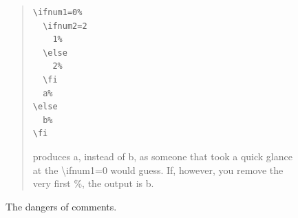 \documentclass{article} \usepackage[utf8]{inputenc}
\begin{document}
\begin{figure}[hbtp]
\begin{myquote}
\begin{quote}
\begin{lstlisting}[columns=fullflexible, backgroundcolor = \color{codebggray}]
\ifnum1=0%
  \ifnum2=2
    1%
  \else
    2%
  \fi
  a%
\else
  b%
\fi
\end{lstlisting}
produces a, instead of b, as someone that took a quick glance at the \textbackslash ifnum1=0 would guess. If, however, you remove the very first \%, the output is b.
\end{quote}
\end{myquote}
\caption{The dangers of comments.}
\label{fig:dangernoodle}
\end{figure}
\end{document}
